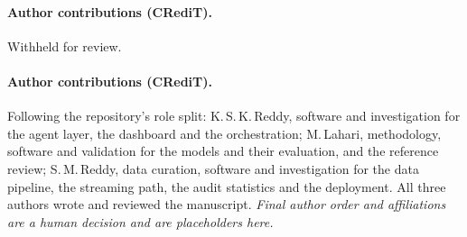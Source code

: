 \ifdefined\anonmode\paragraph{Author contributions (CRediT).} Withheld for review.\else
\paragraph{Author contributions (CRediT).} Following the repository's role split: K.\,S.\,K.\,Reddy, software and investigation for the agent layer, the dashboard and the orchestration; M.\,Lahari, methodology, software and validation for the models and their evaluation, and the reference review; S.\,M.\,Reddy, data curation, software and investigation for the data pipeline, the streaming path, the audit statistics and the deployment. All three authors wrote and reviewed the manuscript. \emph{Final author order and affiliations are a human decision and are placeholders here.}
\fi
